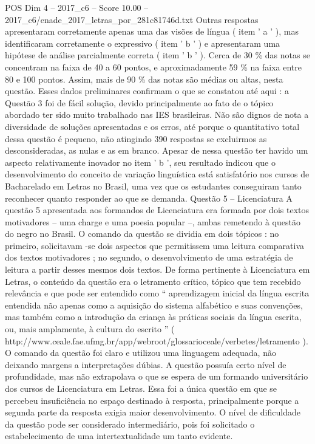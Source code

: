 \begin{textsample}{POS Dim 4 – 2017\_c6 – Score 10.00 – 2017\_c6/enade\_2017\_letras\_por\_281c81746d.txt}
Outras respostas apresentaram corretamente apenas uma das visões de língua ( item ' a ' ), mas identificaram corretamente o expressivo ( item ' b ' ) e apresentaram uma hipótese de análise parcialmente correta ( item ' b ' ).
Cerca de 30 \% das notas se concentram na faixa de 40 a 60 pontos, e aproximadamente 59 \% na faixa entre 80 e 100 pontos.
Assim, mais de 90 \% das notas são médias ou altas, nesta questão.
Esses dados preliminares confirmam o que se constatou até aqui : a Questão 3 foi de fácil solução, devido principalmente ao fato de o tópico abordado ter sido muito trabalhado nas IES brasileiras.
Não são dignos de nota a diversidade de soluções apresentadas e os erros, até porque o quantitativo total dessa questão é pequeno, não atingindo 390 respostas se excluirmos as desconsideradas, as nulas e as em branco.
Apesar de nessa questão ter havido um aspecto relativamente inovador no item ' b ', seu resultado indicou que o desenvolvimento do conceito de variação linguística está satisfatório nos cursos de Bacharelado em Letras no Brasil, uma vez que os estudantes conseguiram tanto reconhecer quanto responder ao que se demanda.
Questão 5 – Licenciatura A questão 5 apresentada aos formandos de Licenciatura era formada por dois textos motivadores – uma charge e uma poesia popular –, ambas remetendo à questão do negro no Brasil.
O comando da questão se dividia em dois tópicos : no primeiro, solicitavam -se dois aspectos que permitissem uma leitura comparativa dos textos motivadores ; no segundo, o desenvolvimento de uma estratégia de leitura a partir desses mesmos dois textos.
De forma pertinente à Licenciatura em Letras, o conteúdo da questão era o letramento crítico, tópico que tem recebido relevância e que pode ser entendido como “ aprendizagem inicial da língua escrita entendida não apenas como a aquisição do sistema alfabético e suas convenções, mas também como a introdução da criança às práticas sociais da língua escrita, ou, mais amplamente, à cultura do escrito ” ( http://www.ceale.fae.ufmg.br/app/webroot/glossarioceale/verbetes/letramento ).
O comando da questão foi claro e utilizou uma linguagem adequada, não deixando margens a interpretações dúbias.
A questão possuía certo nível de profundidade, mas não extrapolava o que se espera de um formando universitário dos cursos de Licenciatura em Letras.
Essa foi a única questão em que se percebeu insuficiência no espaço destinado à resposta, principalmente porque a segunda parte da resposta exigia maior desenvolvimento.
O nível de dificuldade da questão pode ser considerado intermediário, pois foi solicitado o estabelecimento de uma intertextualidade um tanto evidente.

\end{textsample}
